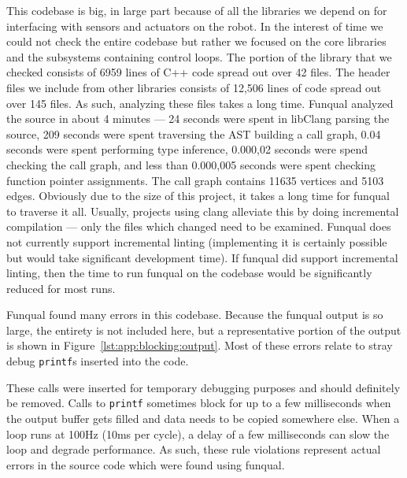 This codebase is big, in large part because of all the libraries we depend on for interfacing with sensors and actuators on the robot.  In the interest of time we could not check the entire codebase but rather we focused on the core libraries and the subsystems containing control loops.  The portion of the library that we checked consists of 6959 lines of C++ code spread out over 42 files.  The header files we include from other libraries consists of 12,506 lines of code spread out over 145 files.  As such, analyzing these files takes a long time.  Funqual analyzed the source in about 4 minutes --- 24 seconds were spent in libClang parsing the source, 209 seconds were spent traversing the AST building a call graph, 0.04 seconds were spent performing type inference, 0.000,02 seconds were spend checking the call graph, and less than 0.000,005 seconds were spent checking function pointer assignments.  The call graph contains 11635 vertices and 5103 edges.  Obviously due to the size of this project, it takes a long time for funqual to traverse it all.  Usually, projects using clang alleviate this by doing incremental compilation --- only the files which changed need to be examined.  Funqual does not currently support incremental linting (implementing it is certainly possible but would take significant development time).  If funqual did support incremental linting, then the time to run funqual on the codebase would be significantly reduced for most runs.  

Funqual found many errors in this codebase.  Because the funqual output is so large, the entirety is not included here, but a representative portion of the output is shown in Figure~\ref{lst:app:blocking:output}.  Most of these errors relate to stray debug \lstinline{printf}s inserted into the code.  

These calls were inserted for temporary debugging purposes and should definitely be removed.  Calls to \lstinline{printf} sometimes block for up to a few milliseconds when the output buffer gets filled and data needs to be copied somewhere else.  When a loop runs at 100Hz (10ms per cycle), a delay of a few milliseconds can slow the loop and degrade performance.  As such, these rule violations represent actual errors in the source code which were found using funqual.  

